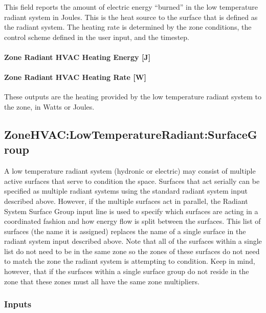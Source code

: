 This field reports the amount of electric energy ``burned'' in the low temperature radiant system in Joules. This is the heat source to the surface that is defined as the radiant system. The heating rate is determined by the zone conditions, the control scheme defined in the user input, and the timestep.

\paragraph{Zone Radiant HVAC Heating Energy {[}J{]}}\label{zone-radiant-hvac-heating-energy-j-2}

\paragraph{Zone Radiant HVAC Heating Rate {[}W{]}}\label{zone-radiant-hvac-heating-rate-w-2}

These outputs are the heating provided by the low temperature radiant system to the zone, in Watts or Joules.

\subsection{ZoneHVAC:LowTemperatureRadiant:SurfaceGroup}\label{zonehvaclowtemperatureradiantsurfacegroup}

A low temperature radiant system (hydronic or electric) may consist of multiple active surfaces that serve to condition the space. Surfaces that act serially can be specified as multiple radiant systems using the standard radiant system input described above. However, if the multiple surfaces act in parallel, the Radiant System Surface Group input line is used to specify which surfaces are acting in a coordinated fashion and how energy flow is split between the surfaces. This list of surfaces (the name it is assigned) replaces the name of a single surface in the radiant system input described above. Note that all of the surfaces within a single list do not need to be in the same zone so the zones of these surfaces do not need to match the zone the radiant system is attempting to condition. Keep in mind, however, that if the surfaces within a single surface group do not reside in the zone that these zones must all have the same zone multipliers.

\subsubsection{Inputs}\label{inputs-8-017}

